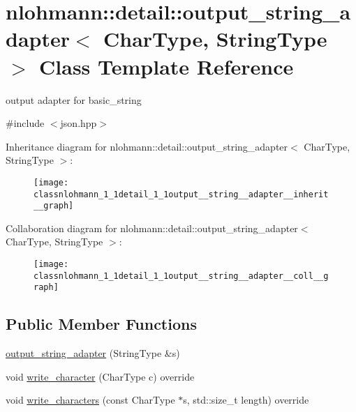 \hypertarget{classnlohmann_1_1detail_1_1output__string__adapter}{}\section{nlohmann\+:\+:detail\+:\+:output\+\_\+string\+\_\+adapter$<$ Char\+Type, String\+Type $>$ Class Template Reference}
\label{classnlohmann_1_1detail_1_1output__string__adapter}


output adapter for basic\+\_\+string  




{\ttfamily \#include $<$json.\+hpp$>$}



Inheritance diagram for nlohmann\+:\+:detail\+:\+:output\+\_\+string\+\_\+adapter$<$ Char\+Type, String\+Type $>$\+:\nopagebreak
\begin{figure}[H]
\begin{center}
\leavevmode
\texttt{[image: classnlohmann\_1\_1detail\_1\_1output\_\_string\_\_adapter\_\_inherit\_\_graph]}
\end{center}
\end{figure}


Collaboration diagram for nlohmann\+:\+:detail\+:\+:output\+\_\+string\+\_\+adapter$<$ Char\+Type, String\+Type $>$\+:\nopagebreak
\begin{figure}[H]
\begin{center}
\leavevmode
\texttt{[image: classnlohmann\_1\_1detail\_1\_1output\_\_string\_\_adapter\_\_coll\_\_graph]}
\end{center}
\end{figure}
\subsection*{Public Member Functions}
\begin{DoxyCompactItemize}
\item 
\hyperlink{classnlohmann_1_1detail_1_1output__string__adapter_a1e21ccc96316cb7fc1adcc58f509d581}{output\+\_\+string\+\_\+adapter} (String\+Type \&s)
\item 
void \hyperlink{classnlohmann_1_1detail_1_1output__string__adapter_a2d76cc6c88ddbc196a63fcfcac9ee7d1}{write\+\_\+character} (Char\+Type c) override
\item 
void \hyperlink{classnlohmann_1_1detail_1_1output__string__adapter_ab5ea4da075305d225dfd84ad997e8747}{write\+\_\+characters} (const Char\+Type $\ast$s, std\+::size\+\_\+t length) override
\end{DoxyCompactItemize}


